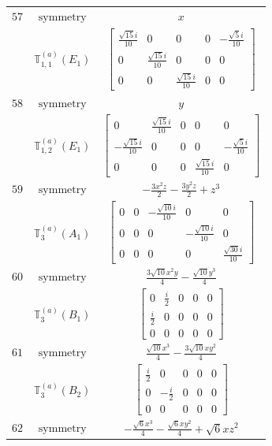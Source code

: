 \documentclass[fleqn,8pt,landscape]{jsarticle}
\begin{document}
\begin{longtable}{ccc}
$ 57 $ & $ \text{symmetry} $ & $ x $ \\
$  $ & $ \mathbb{T}_{1,1}^{(a)}(E_{1}) $ & $ \begin{bmatrix} \frac{\sqrt{15} i}{10} & 0 & 0 & 0 & - \frac{\sqrt{5} i}{10} \\ 0 & \frac{\sqrt{15} i}{10} & 0 & 0 & 0 \\ 0 & 0 & \frac{\sqrt{15} i}{10} & 0 & 0 \end{bmatrix} $ \\ \hline
$ 58 $ & $ \text{symmetry} $ & $ y $ \\
$  $ & $ \mathbb{T}_{1,2}^{(a)}(E_{1}) $ & $ \begin{bmatrix} 0 & \frac{\sqrt{15} i}{10} & 0 & 0 & 0 \\ - \frac{\sqrt{15} i}{10} & 0 & 0 & 0 & - \frac{\sqrt{5} i}{10} \\ 0 & 0 & 0 & \frac{\sqrt{15} i}{10} & 0 \end{bmatrix} $ \\ \hline
$ 59 $ & $ \text{symmetry} $ & $ - \frac{3 x^{2} z}{2} - \frac{3 y^{2} z}{2} + z^{3} $ \\
$  $ & $ \mathbb{T}_{3}^{(a)}(A_{1}) $ & $ \begin{bmatrix} 0 & 0 & - \frac{\sqrt{10} i}{10} & 0 & 0 \\ 0 & 0 & 0 & - \frac{\sqrt{10} i}{10} & 0 \\ 0 & 0 & 0 & 0 & \frac{\sqrt{30} i}{10} \end{bmatrix} $ \\ \hline
$ 60 $ & $ \text{symmetry} $ & $ \frac{3 \sqrt{10} x^{2} y}{4} - \frac{\sqrt{10} y^{3}}{4} $ \\
$  $ & $ \mathbb{T}_{3}^{(a)}(B_{1}) $ & $ \begin{bmatrix} 0 & \frac{i}{2} & 0 & 0 & 0 \\ \frac{i}{2} & 0 & 0 & 0 & 0 \\ 0 & 0 & 0 & 0 & 0 \end{bmatrix} $ \\ \hline
$ 61 $ & $ \text{symmetry} $ & $ \frac{\sqrt{10} x^{3}}{4} - \frac{3 \sqrt{10} x y^{2}}{4} $ \\
$  $ & $ \mathbb{T}_{3}^{(a)}(B_{2}) $ & $ \begin{bmatrix} \frac{i}{2} & 0 & 0 & 0 & 0 \\ 0 & - \frac{i}{2} & 0 & 0 & 0 \\ 0 & 0 & 0 & 0 & 0 \end{bmatrix} $ \\ \hline
$ 62 $ & $ \text{symmetry} $ & $ - \frac{\sqrt{6} x^{3}}{4} - \frac{\sqrt{6} x y^{2}}{4} + \sqrt{6} x z^{2} $ \\

\end{longtable}
\end{document}
